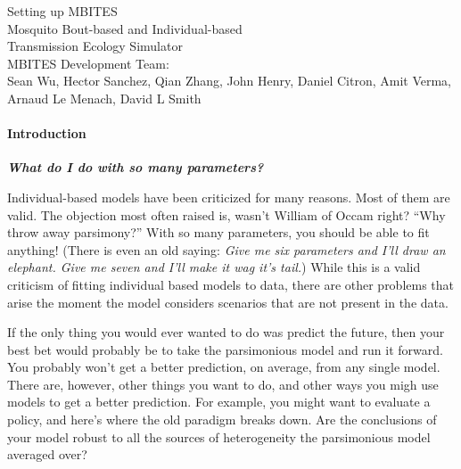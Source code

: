 \documentclass{article}
\begin{document}


\begin{centering}
\huge{Setting up MBITES}\\
\vspace{0.3in}
\Large{Mosquito Bout-based and Individual-based \\ Transmission Ecology Simulator}\\

\vspace{0.3in}
\large{MBITES Development Team: \\ Sean Wu, Hector Sanchez, Qian Zhang, John Henry, Daniel Citron, Amit Verma, Arnaud Le Menach, David L Smith\\}

\end{centering}


\paragraph{Introduction} 

\begin{displayquote}
{\bf \em What do I do with so many parameters?}
\end{displayquote}

Individual-based models have been criticized for many reasons. Most of them are valid. The objection most often raised is, wasn't William of Occam right? ``Why throw away parsimony?'' With so many parameters, you should be able to fit anything! (There is even an old saying: {\em Give me six parameters and I'll draw an elephant. Give me seven and I'll make it wag it's tail.})  While this is a valid criticism of fitting individual based models to data, there are other problems that arise the moment the model considers scenarios that are not present in the data. 

If the only thing you would ever wanted to do was predict the future, then your best bet would probably be to take the parsimonious model and run it forward. You probably won't get a better prediction, on average, from any single model. There are, however, other things you want to do, and other ways you migh use models to get a better prediction. For example, you might want to evaluate a policy, and here's where the old paradigm breaks down. Are the conclusions of your model robust to all the sources of heterogeneity the parsimonious model averaged over?
\end{document}
